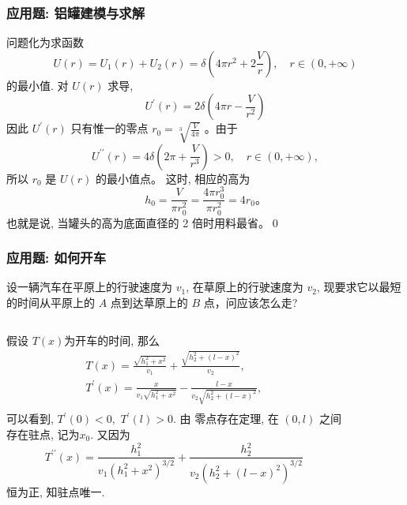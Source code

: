 \documentclass[
10pt,
aspectratio=43,
]{beamer}
\begin{document}
\begin{frame}
	\frametitle{应用题: 铝罐建模与求解}
	问题化为求函数
	$$
		U(r)=U_1(r)+U_2(r)=\delta\left(4 \pi r^2+2 \frac{V}{r}\right), \quad r \in(0,+\infty)
	$$
	的最小值.
	\pause
	对 $U(r)$ 求导,
	$$
		U^{\prime}(r)=2 \delta\left(4 \pi r-\frac{V}{r^2}\right)
	$$
	\pause
	因此 $U^{\prime}(r)$ 只有惟一的零点 $r_0=\sqrt[3]{\frac{V}{4 \pi}}$ 。由于
	$$
		U^{\prime \prime}(r)=4 \delta\left(2 \pi+\frac{V}{r^3}\right)>0, \quad r \in(0,+\infty),
	$$
	\pause
	所以 $r_0$ 是 $U(r)$ 的最小值点。
	这时, 相应的高为
	$$
		h_0=\frac{V}{\pi r_0^2}=\frac{4 \pi r_0^3}{\pi r_0^2}=4 r_0 。
	$$
	\pause
	也就是说, 当罐头的高为底面直径的 2 倍时用料最省。\qed
\end{frame}

\begin{frame}
	\frametitle{应用题: 如何开车}
	\begin{block}{}
		设一辆汽车在平原上的行驶速度为 $v_1$, 在草原上的行驶速度为 $v_2$, 现要求它以最短的时间从平原上的 $A$ 点到达草原上的 $B$ 点，问应该怎么走?
	\end{block}
	\pause
	\begin{columns}
		\begin{column}{0.7\textwidth}
			假设 $T(x)$为开车的时间, 那么
			$$
				\begin{gathered}
					T(x)=\frac{\sqrt{h_1^2+x^2}}{v_1}+\frac{\sqrt{h_2^2+(l-x)^2}}{v_2},\\
					T^{\prime}(x)=\frac{x}{v_1 \sqrt{h_1^2+x^2}}-\frac{l-x}{v_2 \sqrt{h_2^2+(l-x)^2}},\\
				\end{gathered}
			$$
			\pause
			可以看到, $T^{\prime}(0)<0,\,\, T^{\prime}(l)>0$. \pause 由 零点存在定理, 在 $(0,l)$ 之间存在驻点, 记为$x_0$. 又因为
			$$
				T^{\prime \prime}(x)=\frac{h_1^2}{v_1\left(h_1^2+x^2\right)^{3 / 2}}+\frac{h_2^2}{v_2\left(h_2^2+(l-x)^2\right)^{3 / 2}}
			$$
			恒为正, 知驻点唯一.
		\end{column}
		\begin{column}{0.4\textwidth}
			\begin{figure}

\end{figure}
\end{column}
\end{columns}
\end{frame}
\end{document}
